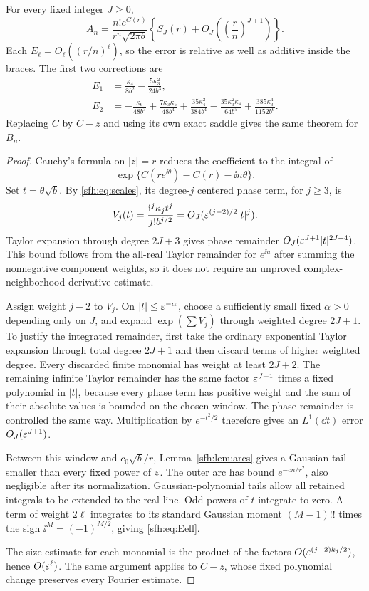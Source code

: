 \begin{theorem}\label{sfh:thm:coeff}
For every fixed integer $J\ge0$,
\begin{equation}\label{sfh:eq:coeff}
 A_n=\frac{n!e^{C(r)}}{r^n\sqrt{2\pi b}}
 \left\{S_J(r)+O_J\left(\left(\frac rn\right)^{J+1}\right)\right\}.
\end{equation}
Each $E_\ell=O_\ell((r/n)^\ell)$, so the error is relative as well as additive inside the braces. The first two corrections are
\begin{align}
 E_1&=\frac{\kappa_4}{8b^2}-\frac{5\kappa_3^2}{24b^3},\label{sfh:eq:E1}\\
 E_2&=-\frac{\kappa_6}{48b^3}
  +\frac{7\kappa_3\kappa_5}{48b^4}
  +\frac{35\kappa_4^2}{384b^4}
  -\frac{35\kappa_3^2\kappa_4}{64b^5}
  +\frac{385\kappa_3^4}{1152b^6}.\label{sfh:eq:E2}
\end{align}
Replacing $C$ by $C-z$ and using its own exact saddle gives the same theorem for $B_n$.
\end{theorem}
\begin{proof}
Cauchy's formula on $|z|=r$ reduces the coefficient to the integral of
\[
 \exp\{C(re^{\ii\theta})-C(r)-\ii n\theta\}.
\]
Set $t=\theta\sqrt b$. By \eqref{sfh:eq:scales}, its degree-$j$ centered phase term, for $j\ge3$, is
\[
 V_j(t)=\frac{\mathrm i^j\kappa_jt^j}{j!b^{j/2}}
       =O_J(\varepsilon^{(j-2)/2}|t|^j).
\]
Taylor expansion through degree $2J+3$ gives phase remainder
$O_J(\varepsilon^{J+1}|t|^{2J+4})$. This bound follows from the all-real Taylor remainder for $e^{\ii u}$ after summing the nonnegative component weights, so it does not require an unproved complex-neighborhood derivative estimate.

Assign weight $j-2$ to $V_j$. On $|t|\le\varepsilon^{-\alpha}$, choose a sufficiently small fixed $\alpha>0$ depending only on $J$, and expand $\exp(\sum V_j)$ through weighted degree $2J+1$. To justify the integrated remainder, first take the ordinary exponential Taylor expansion through total degree $2J+1$ and then discard terms of higher weighted degree. Every discarded finite monomial has weight at least $2J+2$. The remaining infinite Taylor remainder has the same factor $\varepsilon^{J+1}$ times a fixed polynomial in $|t|$, because every phase term has positive weight and the sum of their absolute values is bounded on the chosen window. The phase remainder is controlled the same way. Multiplication by $e^{-t^2/2}$ therefore gives an $L^1(\dd t)$ error $O_J(\varepsilon^{J+1})$.

Between this window and $c_0\sqrt b/r$, Lemma~\ref{sfh:lem:arcs} gives a Gaussian tail smaller than every fixed power of $\varepsilon$. The outer arc has bound $e^{-cn/r^2}$, also negligible after its normalization. Gaussian-polynomial tails allow all retained integrals to be extended to the real line. Odd powers of $t$ integrate to zero. A term of weight $2\ell$ integrates to its standard Gaussian moment $(M-1)!!$ times the sign $\ii^M=(-1)^{M/2}$, giving \eqref{sfh:eq:Eell}.

The size estimate for each monomial is the product of the factors $O(\varepsilon^{(j-2)k_j/2})$, hence $O(\varepsilon^\ell)$. The same argument applies to $C-z$, whose fixed polynomial change preserves every Fourier estimate.
\end{proof}


